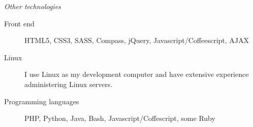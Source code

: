 \documentclass[11pt]{article}
\begin{document}
\medskip

\noindent\emph{Other technologies}

\begin{description}
  \item[Front end] HTML5, CSS3, SASS, Compass, jQuery, Javascript/Coffeescript, AJAX
  \item[Linux] I use Linux as my development computer and have extensive experience administering Linux servers.
  \item[Programming languages] PHP, Python, Java, Bash, Javascript/Coffescript, some Ruby
\end{description}
\end{document}
